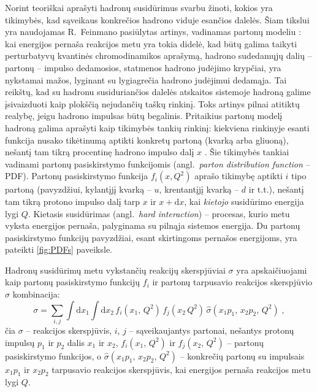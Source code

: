 \documentclass[a4paper, 12pt, oneside]{article}
\newlength\q
\begin{document}
Norint teoriškai aprašyti hadronų susidūrimus svarbu žinoti, kokios yra tikimybės, kad sąveikaus konkrečios
hadrono viduje esančios dalelės.
Šiam tikslui yra naudojamas R.~Feinmano pasiūlytas artinys, vadinamas partonų modeliu \cite{FeynPartons}:
kai energijos pernaša reakcijos metu yra tokia didelė, kad būtų galima taikyti perturbatyvų kvantinės chromodinamikos aprašymą,
hadrono sudedamųjų dalių -- partonų -- impulso dedamosios, statmenos hadrono judėjimo krypčiai, yra nykstamai mažos,
lyginant su lygiagrečia hadrono judėjimui dedamąja.
Tai reikštų, kad su hadronu susiduriančios dalelės atskaitos sistemoje hadroną galime įsivaizduoti kaip plokščią nejudančių
taškų rinkinį.
Toks artinys pilnai atitiktų realybę, jeigu hadrono impulsas būtų begalinis.
Pritaikius partonų modelį hadroną galima aprašyti kaip tikimybės tankių rinkinį: kiekviena rinkinyje esanti funkcija nusako tikėtinumą
aptikti konkretų partoną (kvarką arba gliuoną), nešantį tam tikrą procentinę hadrono impulso dalį $x$ \cite{BjorkPartons}.
Šie tikimybės tankiai vadinami partonų pasiskirstymo funkcijomis (angl.\ \textit{parton distribution function} -- PDF).
Partonų pasiskirstymo funkcija $f_{i}(x, Q^{2})$ aprašo tikimybę aptikti $i$ tipo partoną (pavyzdžiui, kylantįjį kvarką -- $u$,
krentantįjį kvarką -- $d$ ir t.t.), nešantį tam tikrą protono impulso dalį tarp $x$ ir $x\!+\!\mathrm{d}x$, kai \textit{kietojo}
susidūrimo energija lygi $Q$.
Kietasis susidūrimas (angl.\ \textit{hard interaction}) -- procesas, kurio metu vyksta energijos pernaša, palyginama
su pilnąja sistemos energija.
Du partonų pasiskirstymo funkcijų pavyzdžiai, esant skirtingoms pernašos energijoms, yra pateikti
\ref{fig:PDFs} paveiksle.

Hadronų susidūrimų metu vykstančių reakcijų skerspjūviai $\sigma$ yra apskaičiuojami kaip partonų pasiskirstymo
funkcijų $f_i$ ir partonų tarpusavio reakcijos skerspjūvio $\hat{\sigma}$ kombinacija:
\begin{equation}
	\sigma = \sum_{i, j} \int \mathrm{d}x_1 \int \mathrm{d}x_2 \,
	f_{i}(x_1, \, Q^2) \, f_{j}(x_2 \, Q^2) \, \hat{\sigma}(x_1 p_1, \, x_2 p_2, \, Q^2) \; \mathrm{,}
	\label{eq:PDFxsec}
\end{equation}
čia $\sigma$ -- reakcijos skerspjūvis, $i$, $j$ -- sąveikaujantys partonai, nešantys protonų impulsų $p_1$ ir $p_2$
dalis $x_1$ ir $x_2$, $f_{i}(x_1, \, Q^2)$ ir $f_{j}(x_2, \, Q^2)$ -- partonų pasiskirstymo funkcijos, o
$\hat{\sigma}(x_1 p_1, \, x_2 p_2, \, Q^2)$ -- konkrečių partonų su impulsais $x_1 p_1$ ir $x_2 p_2$ tarpusavio
reakcijos skerspjūvis, kai energijos pernaša reakcijos metu lygi $Q$.
\end{document}
